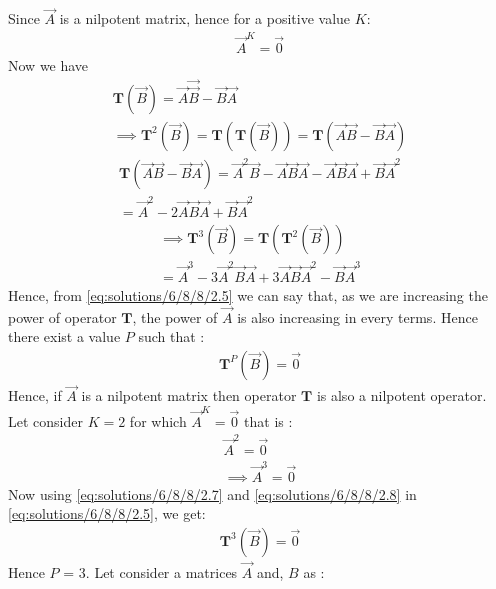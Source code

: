 	Since $\vec{A}$ is a nilpotent  matrix, hence for a positive value $K$:
	\begin{align}
	\vec{A}^K = \vec{0}
	\end{align} 
	Now we have 
	\begin{align}
	\mathbf{T}(\vec{B}) = \vec{A}\vec{\vec{B}} - \vec{B}\vec{A}\\
	\implies  \mathbf{T}^2(\vec{B}) = \mathbf{T}(\mathbf{T}(\vec{B})) =\mathbf{T}(\vec{A}\vec{B} -\vec{B}\vec{A})\label{eq:solutions/6/8/8/2.3}	
	\end{align}
	\begin{multline}
	\mathbf{T}(\vec{A}\vec{B} -\vec{B}\vec{A}) = \vec{A}^2\vec{B} - \vec{A}\vec{B}\vec{A} -\vec{A}\vec{B}\vec{A} + \vec{B}\vec{A}^2 \\= \vec{A}^2 -2\vec{A}\vec{B}\vec{A} +\vec{B}\vec{A}^2
	\end{multline}
	\begin{multline}
	\implies\mathbf{T}^3(\vec{B}) = \mathbf{T}(\mathbf{T}^2(\vec{B})) \\= \vec{A}^3 - 3\vec{A}^2\vec{B}\vec{A} + 3\vec{A}\vec{B}\vec{A}^2 - \vec{B}\vec{A}^3 \label{eq:solutions/6/8/8/2.5}
	\end{multline}
	Hence, from \eqref{eq:solutions/6/8/8/2.5} we can say that, as we are increasing the power of operator $\mathbf{T}$, the power of $\vec{A}$ is also increasing in every terms. Hence there exist   a value $P$  such that :
	\begin{align}
	\mathbf{T}^P (\vec{B})= \vec{0} 
	\end{align} 
	Hence, if $\vec{A}$ is a nilpotent matrix then operator $\mathbf{T}$ is also a nilpotent operator.\\
	Let consider $K = 2$ for which $\vec{A}^K = \vec{0}$ that is :
	\begin{align}
	\vec{A}^2 = \vec{0} \label{eq:solutions/6/8/8/2.7}\\
\implies	\vec{A}^3 = \vec{0} \label{eq:solutions/6/8/8/2.8}
	\end{align} 
	Now using \eqref{eq:solutions/6/8/8/2.7} and \eqref{eq:solutions/6/8/8/2.8} in \eqref{eq:solutions/6/8/8/2.5}, we get:
	\begin{align}
	\mathbf{T}^3(\vec{B}) = \vec{0}
	\end{align}
	Hence $P$ = 3.
	Let consider a matrices $\vec{A}$ and, $B$ as :
